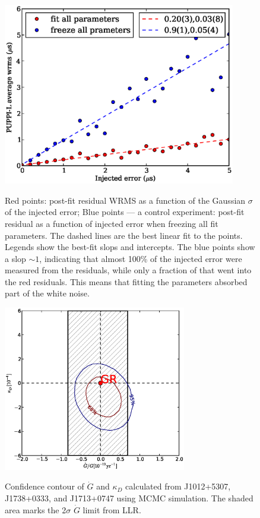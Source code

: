 \documentclass[12pt,preprint]{aastex}
\begin{document}
\begin{figure}
\includegraphics[width=4in]{overfit.eps} \\ 
\caption {\label{fig:overfit} Red points: post-fit residual WRMS as a function of the Gaussian
$\sigma$ of the  injected error; Blue points --- a control experiment:
post-fit residual as a function of injected error when freezing all fit
parameters. The dashed lines are the best linear fit to the points. Legends
show the best-fit slops and intercepts. 
The blue points show a slop $\sim 1$,
indicating that almost 100\% of the injected error were measured from the
residuals, while only a fraction of that went into the red residuals. 
This means that fitting the parameters absorbed part of the white noise.
} 
\end{figure} 

\begin{figure}
\includegraphics[width=8cm]{GdotContour.ps} \\ 
\caption {\label{fig:Gdot} Confidence contour of $\dot{G}$ and $\kappa_D$
calculated from J1012+5307, J1738+0333, and J1713+0747 using MCMC simulation.
The shaded area marks the 2$\sigma$ $\dot{G}$ limit from LLR. 
} 
\end{figure} 







\end{document}
